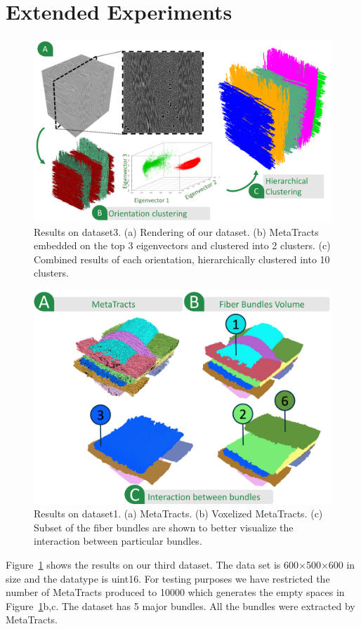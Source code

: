 


\section{Extended Experiments}
\label{sec:ext_exp}

\begin{figure}[h]
	\centering
	\includegraphics[width=\linewidth]{images_pvis/dataset3.pdf}
	\caption{Results on dataset3. (a) Rendering of our dataset. (b) MetaTracts embedded on the top 3 eigenvectors and clustered into 2 clusters. (c) Combined results of each orientation, hierarchically clustered into 10 clusters.}
	\label{fig:dataset3}
\end{figure}
\begin{figure}[h]
	\centering
	\includegraphics[width=\linewidth]{images_pvis/dataset1-extended.pdf}
	\caption{Results on dataset1. (a) MetaTracts. (b) Voxelized MetaTracts. (c) Subset of the fiber bundles are shown to better visualize the interaction between particular bundles.}
	\label{fig:dataset1-extended}
\end{figure}
Figure~\ref{fig:dataset3} shows the results on our third dataset. The data set is 600$\times$500$\times$600 in size and the datatype is uint16. For testing purposes we have restricted the number of MetaTracts produced to 10000 which generates the empty spaces in Figure~\ref{fig:dataset3}b,c.
The dataset has 5 major bundles. All the bundles were extracted by MetaTracts.

